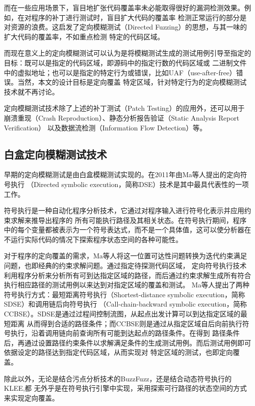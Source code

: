 \documentclass[bachelor]{njupthesis}
\begin{document}
而在一些应用场景下，盲目地扩张代码覆盖率未必能取得很好的漏洞检测效果。例如，在对程序的补丁进行测试时，盲目扩大代码的覆盖率
检测正常运行的部分是对资源的浪费。这启发了定向模糊测试（Directed Fuzzing）的思想，与其一味的扩大代码的覆盖率，不如重点检测
特定的代码区域。

而现在意义上的定向模糊测试可以认为是将模糊测试生成的测试用例引导至指定的目标：既可以是指定的代码区域，即源码中的指定行数的代码区域或
二进制文件中的虚拟地址；也可以是指定的特定行为或错误，比如UAF（use-after-free）错误。当然，本文的设计目标是定向覆盖
特定区域，针对特定行为的定向模糊测试技术就不再讨论。

定向模糊测试技术除了上述的补丁测试（Patch Testing）的应用外，还可以用于崩溃重现（Crash Reproduction）、静态分析报告验证（Static Analysis Report Verification）
以及数据流检测（Information Flow Detection）等。
\subsection{白盒定向模糊测试技术}
早期的定向模糊测试是由白盒模糊测试实现的。在2011年由Ma等人提出的定向符号执行\cite{ma2011directed}
（Directed symbolic execution，简称DSE）技术是其中最具代表性的一项工作。

符号执行\cite{king1976select}是一种自动化程序分析技术，它通过对程序输入进行符号化表示并应用约束求解来推导出程序的
所有可能执行路径及其相关状态。在符号执行期间，程序中的每个变量都被表示为一个符号表达式，而不是一个具体值，这可以使分析器在
不运行实际代码的情况下探索程序状态空间的各种可能性。

对于程序的定向覆盖的需求，Ma等人将这一位置可达性问题转换为迭代约束满足问题，也即经典的约束求解问题。通过指定待探测代码区域，
定向符号执行技术利用程序分析来分析所有可到达指定区域的路径，而后通过约束求解生成所有符合执行相应路径的测试用例以来达到对指定区域的覆盖和测试。
Ma等人提出了两种符号执行方式：最短距离符号执行（Shortest-distance symbolic execution，简称SDSE）和调用链后向符号执行
（Call-chain-backward symbolic execution，简称CCBSE）。SDSE是通过过程间控制流图，从起点出发计算可以到达指定区域的最短距离
从而得到合适的路径条件；而CCBSE则是通过从指定区域自后向前执行符号执行，沿着调用链向前查询所有可能到达起点的路径条件。在得到
路径条件后，再通过设置路径约束条件以求解满足条件的生成测试用例。而后测试用例即可依据设定的路径达到指定代码区域，从而实现对
特定区域的测试，也即定向覆盖。

除此以外，无论是结合污点分析技术的BuzzFuzz\cite{ganesh2009taint}，还是结合动态符号执行的KLEE\cite{cadar2008klee},都
无外乎是在符号执行引擎中实现，采用探索可行路径的状态空间的方式来实现定向覆盖。
\end{document}
